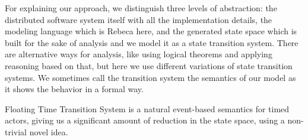 For explaining our approach, we distinguish three levels of abstraction: the distributed software system itself with all the implementation details, the modeling language which is Rebeca here, and the generated state space which is built for the sake of analysis and  we model it as a state transition system. There are alternative ways for analysis, like using logical theorems and applying reasoning based on that, but here we use different variations of state transition systems.
We sometimes call the transition system the semantics of our model as it shows the behavior in a formal way.



Floating Time Transition System is a natural event-based semantics for timed actors, giving us a significant amount of reduction in the state space, using a non-trivial novel idea.
	